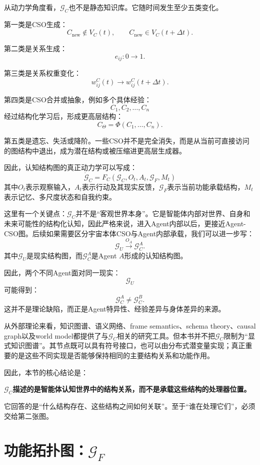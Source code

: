 从动力学角度看，$\mathcal G_C$也不是静态知识库。它随时间发生至少五类变化。

第一类是CSO生成：
\[
C_{\text{new}}\notin V_C(t),
\qquad
C_{\text{new}}\in V_C(t+\Delta t).
\]

第二类是关系生成：
\[
e_{ij}:0\rightarrow1.
\]

第三类是关系权重变化：
\[
w_{ij}^C(t)
\rightarrow
w_{ij}^C(t+\Delta t).
\]

第四类是CSO合并或抽象，例如多个具体经验：
\[
C_1,C_2,\ldots,C_n
\]
经过结构化学习后，形成更高层结构：
\[
C_\Theta
=
\Phi(C_1,\ldots,C_n).
\]

第五类是遗忘、失活或降阶。一些CSO并不是完全消失，而是从当前可直接访问的图结构中退出，成为潜在结构或被压缩进更高层生成器。

因此，认知结构图的真正动力学可以写成：
\[
\boxed{
\dot{\mathcal G}_C
=
F_C
\left(
\mathcal G_C,
O_t,
A_t,
\mathcal G_F,
M_t
\right)
}
\]
其中$O_t$表示观察输入，$A_t$表示行动及其现实反馈，$\mathcal G_F$表示当前功能承载结构，$M_t$表示记忆、多尺度状态和自我约束。

这里有一个关键点：$\mathcal G_C$并不是“客观世界本身”。它是智能体内部对世界、自身和未来可能性的结构化认知，因此严格来说，进入Agent内部以后，更接近Agent-CSO图。后续如果需要区分宇宙本体CSO与Agent内部承载，我们可以进一步写：
\[
\mathcal G_U
\xrightarrow{O_A}
\mathcal G_C^A.
\]
其中$\mathcal G_U$是现实结构图，而$\mathcal G_C^A$是Agent $A$形成的认知结构图。

因此，两个不同Agent面对同一现实：
\[
\mathcal G_U
\]
可能得到：
\[
\mathcal G_C^A
\neq
\mathcal G_C^B.
\]
这并不是理论缺陷，而正是Agent特异性、经验差异与身体差异的来源。

从外部理论来看，知识图谱、语义网络、frame semantics、schema theory、causal graph以及world model都提供了与$\mathcal G_C$相关的研究工具。但本书并不把$\mathcal G_C$限制为“显式知识图谱”。其节点既可以具有符号接口，也可以由分布式潜变量实现；真正重要的是这些不同实现是否能够保持相同的主要结构关系和功能作用。

因此，本节的核心结论是：
\begin{conclusion}
\bfseries
$\mathcal G_C$描述的是智能体认知世界中的结构关系，而不是承载这些结构的处理器位置。
\end{conclusion}

它回答的是“什么结构存在、这些结构之间如何关联”。至于“谁在处理它们”，必须交给第二张图。

\section{功能拓扑图：$\mathcal G_F$}

